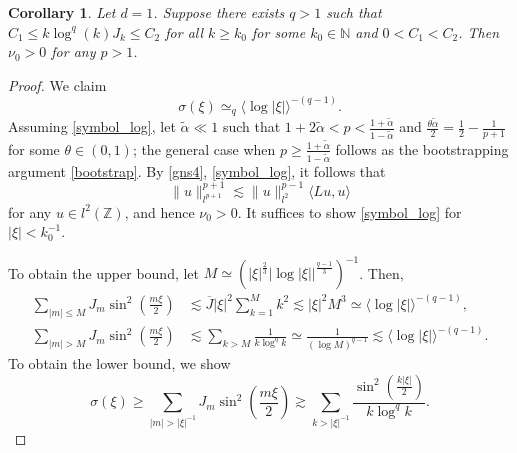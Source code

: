 \documentclass{article}
\numberwithin{equation}{section}
\newtheorem{corollary}{Corollary}[section]
\begin{document}
\begin{corollary}\label{p4}
    Let $d = 1$. Suppose there exists $q > 1$ such that $C_1 \leq k \log^q (k) J_k \leq C_2$ for all $k \geq k_0$ for some $k_0 \in \mathbb{N}$ and $0< C_1 < C_2$. Then $\nu_0 > 0$ for any $p > 1$. 
\end{corollary}
\begin{proof}
We claim
\begin{equation}\label{symbol_log}
\sigma(\xi) \simeq_{q} \langle \log |\xi|\rangle^{-(q-1)}.
\end{equation}
Assuming \eqref{symbol_log}, let $\tilde{\alpha} \ll 1$ such that $1+ 2\tilde{\alpha} < p < \frac{1+\tilde{\alpha}}{1-\tilde{\alpha}}$ and $\frac{\theta \tilde{\alpha}}{2} = \frac{1}{2} - \frac{1}{p+1}$ for some $\theta \in (0,1)$; the general case when $p \geq \frac{1+\tilde{\alpha}}{1-\tilde{\alpha}}$ follows as the bootstrapping argument \eqref{bootstrap}. By \eqref{gns4}, \eqref{symbol_log}, it follows that 
\begin{equation*}
\| u \|_{l^{p+1}}^{p+1} \lesssim \| u \|_{l^{2}}^{p-1} \langle Lu,u \rangle    
\end{equation*}
for any $u \in l^2(\mathbb{Z})$, and hence $\nu_0 > 0$. It suffices to show \eqref{symbol_log} for $|\xi| < k_0^{-1}$. 

To obtain the upper bound, let $M \simeq (|\xi|^{\frac{2}{3}} |\log |\xi||^{\frac{q-1}{3}})^{-1}$. Then,
\begin{equation*}
\begin{split}
\sum_{|m| \leq M} J_{m}\sin^2\left(\frac{m  \xi}{2}\right) &\lesssim \overline{J}|\xi|^2 \sum_{k=1}^M k^{2} \lesssim |\xi|^2 M^{3} \simeq \langle\log |\xi|\rangle^{-(q-1)},\\
\sum_{|m| > M}  J_{m}\sin^2\left(\frac{m \xi}{2}\right) &\lesssim \sum_{k > M} \frac{1}{k \log^q k} \simeq \frac{1}{(\log M)^{q-1}} \lesssim \langle\log |\xi|\rangle^{-(q-1)}.
\end{split}
\end{equation*}
To obtain the lower bound, we show
\begin{equation*}
    \sigma(\xi) \geq \sum\limits_{|m| > |\xi|^{-1}} J_m \sin^2 \left(\frac{m \xi}{2}\right) \gtrsim \sum\limits_{k > |\xi|^{-1}} \frac{\sin^2 \left(\frac{k |\xi|}{2}\right)}{k \log^q k}.
\end{equation*}


\end{proof}
\end{document}

